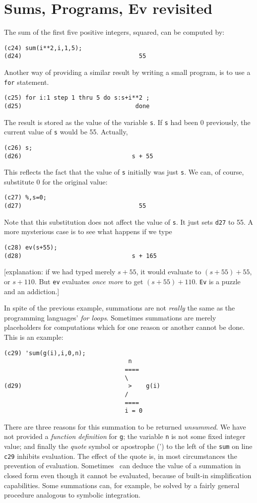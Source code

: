 \section{Sums, Programs, Ev revisited}

The sum of the first five positive integers, squared, can be computed by:
\begin{verbatim}
(c24) sum(i**2,i,1,5);
(d24)                                 55
\end{verbatim}
Another way of providing a similar result by writing a small program,
is to use a {\tt for}
statement.
\begin{verbatim}
(c25) for i:1 step 1 thru 5 do s:s+i**2 ;
(d25)                                done
\end{verbatim}
The result is stored as the value of the variable {\tt s}.
If {\tt s} had been 0 previously, the current value of {\tt s}
would be 55.  Actually,
\begin{verbatim}
(c26) s;
(d26)                               s + 55
\end{verbatim}
This reflects the fact that the value of {\tt s}
initially was just {\tt s}.
We can, of course, substitute 0 for the original value:
\begin{verbatim}
(c27) %,s=0;
(d27)                                 55
\end{verbatim}
Note that this substitution does not affect the value of {\tt s}. 
It just sets {\tt d27} to 55.
A more mysterious case is to see what happens
if we type
\begin{verbatim}
(c28) ev(s+55);
(d28)                               s + 165
\end{verbatim}
[explanation: if we had typed merely $s+55$, it would evaluate to $(s+55)+55$, 
or $s+110$.  But {\tt ev} evaluates {\it once more} to get $(s+55)+110$.  
{\tt Ev} is a puzzle and an addiction.]

In spite of the previous example, summations are not {\it really}
the same as the programming languages' {\it for loops}. Sometimes summations
are merely placeholders for computations which for one reason or another
cannot be done.
This is an example:
\begin{verbatim}
(c29) 'sum(g(i),i,0,n);
                                   n
                                  ====
                                  \
(d29)                              >    g(i)
                                  /
                                  ====
                                  i = 0
\end{verbatim}
There are three reasons for this summation to be returned {\it unsummed}. 
We have not provided a {\it function definition} for {\tt g}; the variable
{\tt n} is not some fixed integer value; and finally the {\it quote} 
symbol or apostrophe (') to the left of the {\tt sum} on line {\tt c29}
inhibits evaluation. The effect of the quote is, in most circumstances the 
prevention of evaluation.  Sometimes \Max\
can deduce the value of a summation in closed form even though it
cannot be evaluated, because of built-in simplification capabilities.
Some summations can, for example,
be solved by a fairly general procedure analogous
to symbolic integration.

